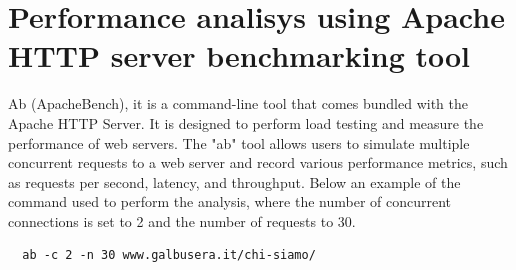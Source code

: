 \documentclass[eng]{class}
\begin{document}
\section{Performance analisys using  Apache HTTP server benchmarking tool}
Ab (ApacheBench), it is a command-line tool that comes bundled with the Apache HTTP Server.
It is designed to perform load testing and measure the performance of web servers.
The "ab" tool allows users to simulate multiple concurrent requests to a web server and record various performance metrics,
such as requests per second, latency, and throughput.
Below an example of the command used to perform the analysis, where the number of concurrent connections is set to 2 and the number of requests to 30.
\begin{lstlisting}
  ab -c 2 -n 30 www.galbusera.it/chi-siamo/
\end{lstlisting}
\end{document}
